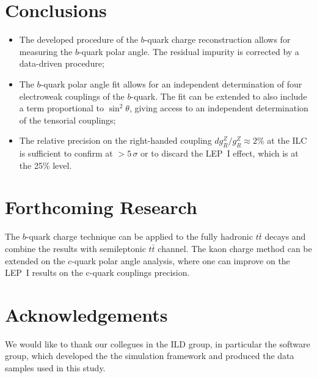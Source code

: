 \documentclass{PoS}
\begin{document}

\section*{Conclusions}

\begin{itemize}
	\item The developed procedure of the $b$-quark charge reconstruction allows for measuring the $b$-quark polar angle. The residual impurity is corrected by a data-driven procedure;
	\item The $b$-quark polar angle fit allows for an independent determination of four electroweak couplings of the $b$-quark. The fit can be extended to also include a term proportional to $\sin^2\theta$, giving access to an independent determination of the tensorial couplings;
	\item  The relative precision on the right-handed coupling $dg^Z_R/g^Z_R\approx 2$\% at the ILC is sufficient to confirm at $>5\,\sigma$ or to discard the LEP~I effect, which is at the 25\% level.
\end{itemize}


\section*{Forthcoming Research}
The $b$-quark charge technique can be applied to the fully hadronic $t\bar{t}$ decays and combine the results with semileptonic $t\bar{t}$ channel.
The kaon charge method can be extended on the $c$-quark polar angle analysis, where one can improve on the LEP~I results on the c-quark couplings precision. 

\section*{Acknowledgements}
We would like to thank our collegues in the ILD group, in particular the software group, which developed the the simulation framework and produced the data samples used in this study.
\end{document}
